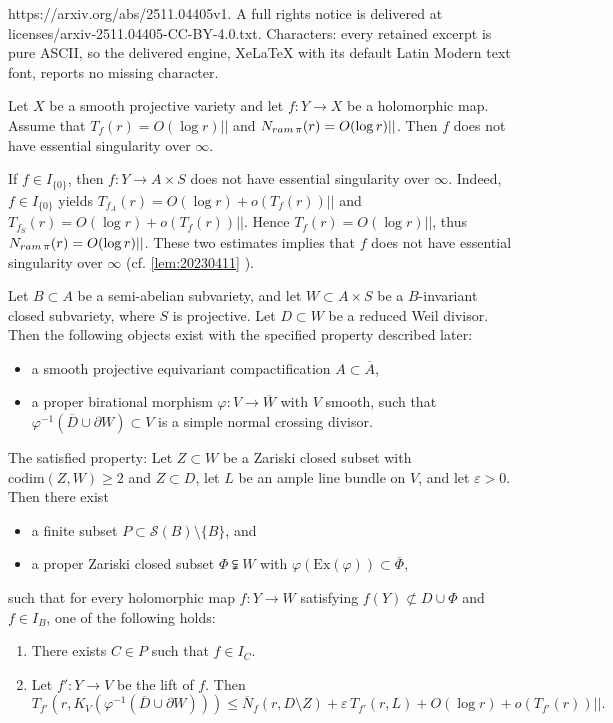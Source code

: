 \documentclass[10pt,a4paper]{amsart}
\newcommand{\ram}{{\rm ram}\,}
\begin{document}
https://arxiv.org/abs/2511.04405v1. A full rights notice is delivered at licenses/arxiv-2511.04405-CC-BY-4.0.txt. Characters: every retained excerpt is pure ASCII, so the delivered engine, XeLaTeX with its default Latin Modern text font, reports no missing character.
	\begin{lem}\label{lem:20230411}
		Let $X$ be a smooth projective variety and let $f:Y\to X$ be a holomorphic map.
		Assume that $T_f(r)=O(\log r)||$ and $N_{\ram\pi}(r)=O(\log r)||$. 
		Then $f$ does not have essential singularity over $\infty$.
	\end{lem}

	\begin{rem}\label{rem:20221203}
		If $f\in I_{\{0\}}$, then $f:Y\to A\times S$ does not have essential singularity over $\infty$.
		Indeed, $f\in I_{\{0\}}$ yields $T_{f_A}(r)=O(\log r)+o(T_f(r))||$ and  $T_{f_S}(r)=O(\log r)+o(T_f(r))||$.
		Hence $T_f(r)=O(\log r)||$, thus $N_{\ram\pi}(r)=O(\log r)||$.
		These two estimates implies that $f$ does not have essential singularity over $\infty$ (cf. \cref{lem:20230411} ). 
	\end{rem}

	\begin{lem}\label{lem:20220909gg}
Let $B \subset A$ be a semi-abelian subvariety, and let $W \subset A \times S$ be a $B$-invariant closed subvariety, where $S$ is projective. Let $D \subset W$ be a reduced Weil divisor.  
Then the following objects exist with the specified property described later: 
\begin{itemize}
    \item a smooth projective equivariant compactification $A \subset \overline{A}$,
    \item a proper birational morphism $\varphi: V \to \overline{W}$ with $V$ smooth, such that 
    \(\varphi^{-1}(\overline{D} \cup \partial W) \subset V\) is a simple normal crossing divisor.
\end{itemize}
The satisfied property: Let $Z \subset W$ be a Zariski closed subset with $\mathrm{codim}(Z,W) \ge 2$ and $Z \subset D$, let $L$ be an ample line bundle on $V$, and let $\varepsilon > 0$. Then there exist
\begin{itemize}
    \item a finite subset $P \subset \mathcal{S}(B) \setminus \{B\}$, and
    \item a proper Zariski closed subset $\Phi \subsetneqq W$ with $\varphi(\mathrm{Ex}(\varphi)) \subset \overline{\Phi}$,
\end{itemize}
such that for every holomorphic map $f: Y \to W$ satisfying $f(Y) \not\subset D \cup \Phi$ and $f \in I_B$, one of the following holds:
\begin{enumerate}
    \item There exists $C \in P$ such that $f \in I_C$.
    \item Let $f': Y \to V$ be the lift of $f$. Then
    \[
    T_{f'}(r, K_V(\varphi^{-1}(\overline{D} \cup \partial W))) \le \overline{N}_f(r, D \setminus Z) + \varepsilon\, T_{f'}(r,L) + O(\log r) + o(T_{f'}(r))||.
    \]
\end{enumerate}
\end{lem}
\end{document}
